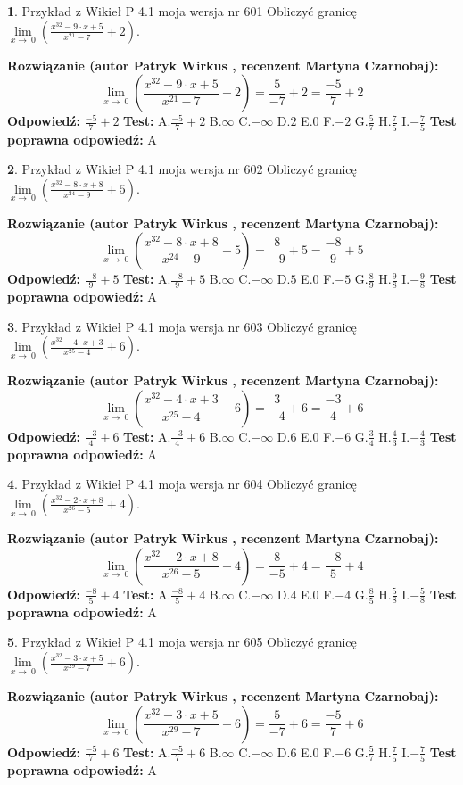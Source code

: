\documentclass[12pt, a4paper]{article}
\theoremstyle{definition} %
\newtheorem{zad}{}
\newcommand{\zadStart}[1]{\begin{zad}#1\newline}
\newcommand{\zadStop}{\end{zad}}
\newcommand{\rozwStart}[2]{\noindent \textbf{Rozwiązanie (autor #1 , recenzent #2): }\newline}
\newcommand{\rozwStop}{\newline}
\newcommand{\odpStart}{\noindent \textbf{Odpowiedź:}\newline}
\newcommand{\odpStop}{\newline}
\newcommand{\testStart}{\noindent \textbf{Test:}\newline}
\newcommand{\testStop}{\newline}
\newcommand{\kluczStart}{\noindent \textbf{Test poprawna odpowiedź:}\newline}
\newcommand{\kluczStop}{\newline}
\begin{document}
\zadStart{Przykład z Wikieł P 4.1 moja wersja nr 601}
Obliczyć granicę $\lim\limits_{x\to\ 0}(\frac{x^{32}-9 \cdot x +5}{x^{21}-7}+2)$.
\zadStop
\rozwStart{Patryk Wirkus}{Martyna Czarnobaj}
$$\lim\limits_{x\to\ 0}(\frac{x^{32}-9 \cdot x +5}{x^{21}-7}+2)=\frac{5}{-7}+2=\frac{-5}{7}+2$$
\rozwStop
\odpStart
$\frac{-5}{7}+2$
\odpStop
\testStart
A.$\frac{-5}{7}+2$
B.$\infty$
C.$-\infty$
D.$2$
E.$0$
F.$-2$
G.$\frac{5}{7}$
H.$\frac{7}{5}$
I.$-\frac{7}{5}$
\testStop
\kluczStart
A
\kluczStop



\zadStart{Przykład z Wikieł P 4.1 moja wersja nr 602}
Obliczyć granicę $\lim\limits_{x\to\ 0}(\frac{x^{32}-8 \cdot x +8}{x^{24}-9}+5)$.
\zadStop
\rozwStart{Patryk Wirkus}{Martyna Czarnobaj}
$$\lim\limits_{x\to\ 0}(\frac{x^{32}-8 \cdot x +8}{x^{24}-9}+5)=\frac{8}{-9}+5=\frac{-8}{9}+5$$
\rozwStop
\odpStart
$\frac{-8}{9}+5$
\odpStop
\testStart
A.$\frac{-8}{9}+5$
B.$\infty$
C.$-\infty$
D.$5$
E.$0$
F.$-5$
G.$\frac{8}{9}$
H.$\frac{9}{8}$
I.$-\frac{9}{8}$
\testStop
\kluczStart
A
\kluczStop



\zadStart{Przykład z Wikieł P 4.1 moja wersja nr 603}
Obliczyć granicę $\lim\limits_{x\to\ 0}(\frac{x^{32}-4 \cdot x +3}{x^{25}-4}+6)$.
\zadStop
\rozwStart{Patryk Wirkus}{Martyna Czarnobaj}
$$\lim\limits_{x\to\ 0}(\frac{x^{32}-4 \cdot x +3}{x^{25}-4}+6)=\frac{3}{-4}+6=\frac{-3}{4}+6$$
\rozwStop
\odpStart
$\frac{-3}{4}+6$
\odpStop
\testStart
A.$\frac{-3}{4}+6$
B.$\infty$
C.$-\infty$
D.$6$
E.$0$
F.$-6$
G.$\frac{3}{4}$
H.$\frac{4}{3}$
I.$-\frac{4}{3}$
\testStop
\kluczStart
A
\kluczStop



\zadStart{Przykład z Wikieł P 4.1 moja wersja nr 604}
Obliczyć granicę $\lim\limits_{x\to\ 0}(\frac{x^{32}-2 \cdot x +8}{x^{26}-5}+4)$.
\zadStop
\rozwStart{Patryk Wirkus}{Martyna Czarnobaj}
$$\lim\limits_{x\to\ 0}(\frac{x^{32}-2 \cdot x +8}{x^{26}-5}+4)=\frac{8}{-5}+4=\frac{-8}{5}+4$$
\rozwStop
\odpStart
$\frac{-8}{5}+4$
\odpStop
\testStart
A.$\frac{-8}{5}+4$
B.$\infty$
C.$-\infty$
D.$4$
E.$0$
F.$-4$
G.$\frac{8}{5}$
H.$\frac{5}{8}$
I.$-\frac{5}{8}$
\testStop
\kluczStart
A
\kluczStop



\zadStart{Przykład z Wikieł P 4.1 moja wersja nr 605}
Obliczyć granicę $\lim\limits_{x\to\ 0}(\frac{x^{32}-3 \cdot x +5}{x^{29}-7}+6)$.
\zadStop
\rozwStart{Patryk Wirkus}{Martyna Czarnobaj}
$$\lim\limits_{x\to\ 0}(\frac{x^{32}-3 \cdot x +5}{x^{29}-7}+6)=\frac{5}{-7}+6=\frac{-5}{7}+6$$
\rozwStop
\odpStart
$\frac{-5}{7}+6$
\odpStop
\testStart
A.$\frac{-5}{7}+6$
B.$\infty$
C.$-\infty$
D.$6$
E.$0$
F.$-6$
G.$\frac{5}{7}$
H.$\frac{7}{5}$
I.$-\frac{7}{5}$
\testStop
\kluczStart
A
\kluczStop
\end{document}
